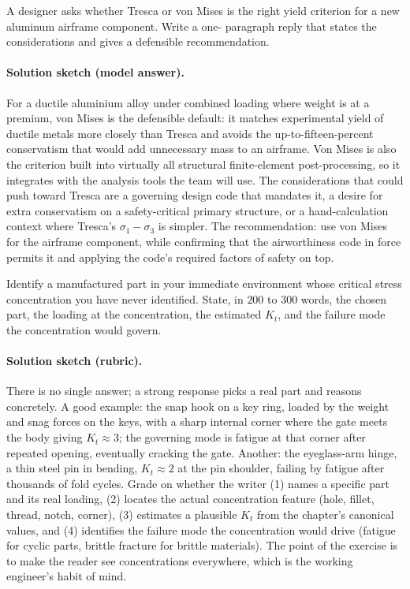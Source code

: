 \begin{exercise}
A designer asks whether Tresca or von Mises is the right yield
criterion for a new aluminum airframe component. Write a one-
paragraph reply that states the considerations and gives a defensible
recommendation.
\paragraph{Solution sketch (model answer).} For a ductile aluminium
alloy under combined loading where weight is at a premium, von Mises is
the defensible default: it matches experimental yield of ductile metals
more closely than Tresca and avoids the up-to-fifteen-percent
conservatism that would add unnecessary mass to an airframe. Von Mises
is also the criterion built into virtually all structural finite-element
post-processing, so it integrates with the analysis tools the team will
use. The considerations that could push toward Tresca are a governing
design code that mandates it, a desire for extra conservatism on a
safety-critical primary structure, or a hand-calculation context where
Tresca's $\sigma_1 - \sigma_3$ is simpler. The recommendation: use von
Mises for the airframe component, while confirming that the airworthiness
code in force permits it and applying the code's required factors of
safety on top.
\end{exercise}

\begin{exercise}
Identify a manufactured part in your immediate environment whose
critical stress concentration you have never identified. State, in
$200$ to $300$ words, the chosen part, the loading at the
concentration, the estimated $K_t$, and the failure mode the
concentration would govern.
\paragraph{Solution sketch (rubric).} There is no single answer; a
strong response picks a real part and reasons concretely. A good
example: the snap hook on a key ring, loaded by the weight and snag
forces on the keys, with a sharp internal corner where the gate meets
the body giving $K_t \approx 3$; the governing mode is fatigue at that
corner after repeated opening, eventually cracking the gate. Another:
the eyeglass-arm hinge, a thin steel pin in bending, $K_t \approx 2$ at
the pin shoulder, failing by fatigue after thousands of fold cycles.
Grade on whether the writer (1) names a specific part and its real
loading, (2) locates the actual concentration feature (hole, fillet,
thread, notch, corner), (3) estimates a plausible $K_t$ from the chapter's
canonical values, and (4) identifies the failure mode the concentration
would drive (fatigue for cyclic parts, brittle fracture for brittle
materials). The point of the exercise is to make the reader see
concentrations everywhere, which is the working engineer's habit of
mind.
\end{exercise}
